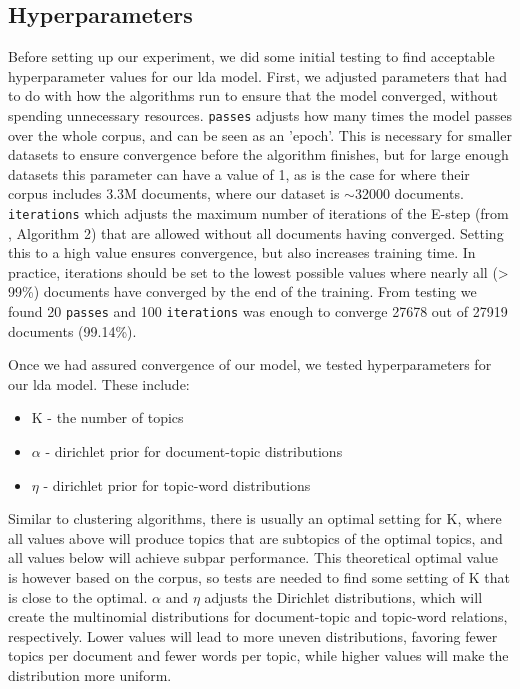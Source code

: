 \subsection{Hyperparameters}\label{subsec:hyperparameters}
Before setting up our experiment, we did some initial testing to find acceptable hyperparameter values for our \gls{lda} model.
First, we adjusted parameters that had to do with how the algorithms run to ensure that the model converged, without spending unnecessary resources.
\texttt{passes} adjusts how many times the model passes over the whole corpus, and can be seen as an 'epoch'. 
This is necessary for smaller datasets to ensure convergence before the algorithm finishes, but for large enough datasets this parameter can have a value of 1, as is the case for \cite{blei2010online} where their corpus includes 3.3M documents, where our dataset is $\sim$32000 documents.
\texttt{iterations} which adjusts the maximum number of iterations of the E-step (from \cite{}, Algorithm 2) that are allowed without all documents having converged. 
Setting this to a high value ensures convergence, but also increases training time. 
In practice, iterations should be set to the lowest possible values where nearly all (> 99\%) documents have converged by the end of the training.
From testing we found 20 \texttt{passes} and 100 \texttt{iterations} was enough to converge 27678 out of 27919 documents (99.14\%).

Once we had assured convergence of our model, we tested hyperparameters for our \gls{lda} model.
These include:
\begin{itemize}
	\item K - the number of topics
	\item $\alpha$ - dirichlet prior for document-topic distributions
	\item $\eta$ - dirichlet prior for topic-word distributions
\end{itemize}
Similar to clustering algorithms, there is usually an optimal setting for K, where all values above will produce topics that are subtopics of the optimal topics, and all values below will achieve subpar performance.
This theoretical optimal value is however based on the corpus, so tests are needed to find some setting of K that is close to the optimal.
$\alpha$ and $\eta$ adjusts the Dirichlet distributions, which will create the multinomial distributions for document-topic and topic-word relations, respectively.
Lower values will lead to more uneven distributions, favoring fewer topics per document and fewer words per topic, while higher values will make the distribution more uniform.

